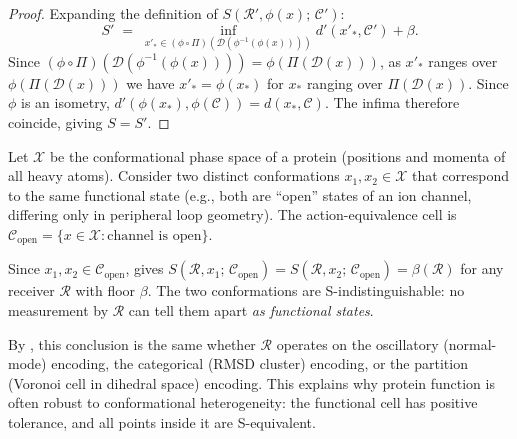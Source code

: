 \begin{proof}
Expanding the definition of $S(\mathcal{R}', \phi(x);\, \mathcal{C}')$:
\[
  S' \;=\; \inf_{x'_* \in (\phi \circ \Pi)(\mathcal{D}(\phi^{-1}(\phi(x))))}
  d'(x'_*, \mathcal{C}') + \beta .
\]
Since $(\phi \circ \Pi)(\mathcal{D}(\phi^{-1}(\phi(x)))) = \phi(\Pi(\mathcal{D}(x)))$,
as $x'_*$ ranges over $\phi(\Pi(\mathcal{D}(x)))$ we have $x'_* = \phi(x_*)$
for $x_*$ ranging over $\Pi(\mathcal{D}(x))$.  Since $\phi$ is an isometry,
$d'(\phi(x_*), \phi(\mathcal{C})) = d(x_*, \mathcal{C})$.  The infima
therefore coincide, giving $S = S'$.
\end{proof}

\begin{example}
\label{ex:protein-conformations}
Let $\mathcal{X}$ be the conformational phase space of a protein (positions
and momenta of all heavy atoms).  Consider two distinct conformations
$x_1, x_2 \in \mathcal{X}$ that correspond to the same functional state
(e.g., both are ``open'' states of an ion channel, differing only in
peripheral loop geometry).  The action-equivalence cell is
$\mathcal{C}_{\text{open}} = \{x \in \mathcal{X} : \text{channel is open}\}$.

Since $x_1, x_2 \in \mathcal{C}_{\text{open}}$, 
gives $S(\mathcal{R}, x_1;\, \mathcal{C}_{\text{open}}) = S(\mathcal{R},
x_2;\, \mathcal{C}_{\text{open}}) = \beta(\mathcal{R})$ for any receiver
$\mathcal{R}$ with floor $\beta$.  The two conformations are
S-indistinguishable: no measurement by $\mathcal{R}$ can tell them apart
\emph{as functional states}.

By , this conclusion is the same whether $\mathcal{R}$
operates on the oscillatory (normal-mode) encoding, the categorical (RMSD
cluster) encoding, or the partition (Voronoi cell in dihedral space) encoding.
This explains why protein function is often robust to conformational
heterogeneity: the functional cell has positive tolerance, and all points
inside it are S-equivalent.
\end{example}

